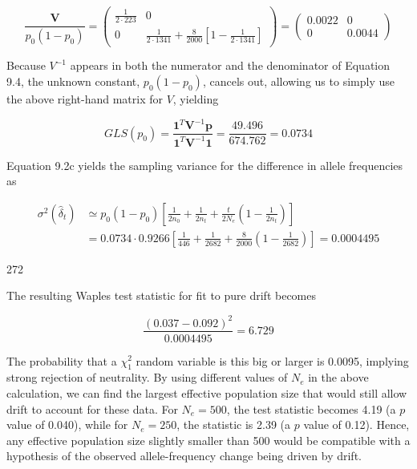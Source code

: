 \documentclass{article}
\begin{document}
\begin{equation}
\frac{\mathbf{V}}{p_{0}(1-p_{0})}=\begin{pmatrix}{{{\frac{1}{2\cdot223}}}}&{{{0}}} \\{{{0}}}&{{{\frac{1}{2\cdot1341}+\frac{8}{2000}\left[1-\frac{1}{2\cdot1341}\right]}}}\end{pmatrix}=\begin{pmatrix}{{{0.0022}}}&{{{0}}} \\{{{0}}}&{{{0.0044}}}\end{pmatrix}
\end{equation}

Because  $ V^{-1} $ appears in both the numerator and the denominator of Equation 9.4, the unknown constant,  $ p_{0}(1 - p_{0}) $, cancels out, allowing us to simply use the above right-hand matrix for  $ V $, yielding

\begin{equation}
GLS\left(p_{0}\right)=\frac{\mathbf{1}^{T}\mathbf{V}^{-1}\mathbf{p}}{\mathbf{1}^{T}\mathbf{V}^{-1}\mathbf{1}}=\frac{49.496}{674.762}=0.0734
\end{equation}

Equation 9.2c yields the sampling variance for the difference in allele frequencies as

\begin{equation}
\begin{aligned}\sigma^{2}\left(\widehat{\delta}_{t}\right)&\simeq p_{0}(1-p_{0})\left[\frac{1}{2n_{0}}+\frac{1}{2n_{t}}+\frac{t}{2N_{e}}\left(1-\frac{1}{2n_{t}}\right)\right]\\ &=0.0734\cdot0.9266\left[\frac{1}{446}+\frac{1}{2682}+\frac{8}{2000}\left(1-\frac{1}{2682}\right)\right]=0.0004495\end{aligned}
\end{equation}

272

The resulting Waples test statistic for fit to pure drift becomes

\begin{equation}
\frac{(0.037-0.092)^{2}}{0.0004495}=6.729
\end{equation}

The probability that a $\chi_{1}^{2}$ random variable is this big or larger is 0.0095, implying strong rejection of neutrality. By using different values of $N_{e}$ in the above calculation, we can find the largest effective population size that would still allow drift to account for these data. For $N_{e}=500$, the test statistic becomes 4.19 (a $p$ value of 0.040), while for $N_{e}=250$, the statistic is 2.39 (a $p$ value of 0.12). Hence, any effective population size slightly smaller than 500 would be compatible with a hypothesis of the observed allele-frequency change being driven by drift.
\end{document}
